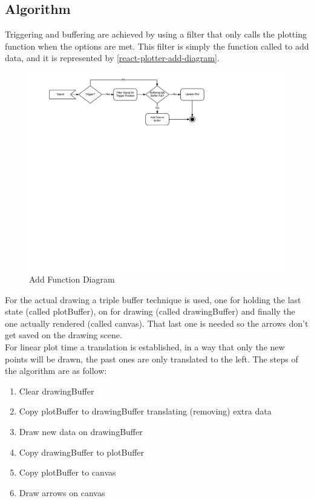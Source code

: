 \subsection{Algorithm}
Triggering and buffering are achieved by using a filter that only calls the plotting
function when the options are met. This filter is simply the function called to
add data, and it is represented by \autoref{react-plotter-add-diagram}. \\
\begin{figure}[htb]
  \caption{Add Function Diagram}
  \label{react-plotter-add-diagram}
  \centering
  \includegraphics[scale=0.9]{images/react-plotter-add-diagram}
\end{figure}
For the actual drawing a triple buffer technique is used, one for holding the last
state (called plotBuffer), on for drawing (called drawingBuffer) and finally the
one actually rendered (called canvas). That last one is needed so the arrows don't
get saved on the drawing scene. \\
For linear plot time a translation is established, in a way that only the new
points will be drawn, the past ones are only translated to the left. The steps
of the algorithm are as follow:
\begin{enumerate}
  \item Clear drawingBuffer
  \item Copy plotBuffer to drawingBuffer translating (removing) extra data
  \item Draw new data on drawingBuffer
  \item Copy drawingBuffer to plotBuffer
  \item Copy plotBuffer to canvas
  \item Draw arrows on canvas
\end{enumerate}


